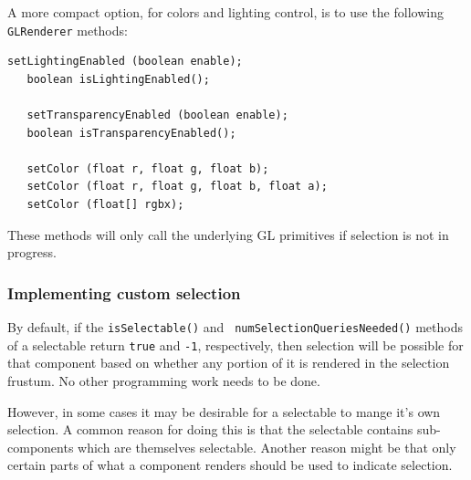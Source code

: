 \documentclass{article}
\begin{document}
A more compact option, for colors and lighting control, is to use the
following {\tt GLRenderer} methods:

\begin{lstlisting}[]
   setLightingEnabled (boolean enable);
   boolean isLightingEnabled();
   
   setTransparencyEnabled (boolean enable);
   boolean isTransparencyEnabled();

   setColor (float r, float g, float b);
   setColor (float r, float g, float b, float a);
   setColor (float[] rgbx);
\end{lstlisting}

These methods will only call the underlying GL primitives if selection
is not in progress.

\subsubsection{Implementing custom selection}
\label{managingOwnSelectionSec}

By default, if the {\tt isSelectable()} and {\tt
numSelectionQueriesNeeded()} methods of a selectable return {\tt true}
and {\tt -1}, respectively, then selection will be possible for that
component based on whether any portion of it is rendered in the
selection frustum. No other programming work needs to be done.

However, in some cases it may be desirable for a selectable to mange
it's own selection. A common reason for doing this is that the
selectable contains sub-components which are themselves
selectable. Another reason might be that only certain parts of what a
component renders should be used to indicate selection.
\end{document}
